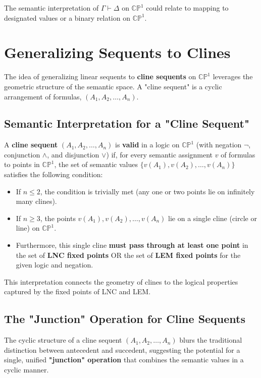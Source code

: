 	The semantic interpretation of $\Gamma \vdash \Delta$ on $\mathbb{CP}^1$ could relate to mapping to designated values or a binary relation on $\mathbb{CP}^1$.
	
	\section{Generalizing Sequents to Clines}
	
	The idea of generalizing linear sequents to \textbf{cline sequents} on $\mathbb{CP}^1$ leverages the geometric structure of the semantic space. A "cline sequent" is a cyclic arrangement of formulas, $(A_1, A_2, \dots, A_n)$.
	
	\subsection{Semantic Interpretation for a "Cline Sequent"}
	
	A \textbf{cline sequent} $(A_1, A_2, \dots, A_n)$ is \textbf{valid} in a logic on $\mathbb{CP}^1$ (with negation $\neg$, conjunction $\wedge$, and disjunction $\vee$) if, for every semantic assignment $v$ of formulas to points in $\mathbb{CP}^1$, the set of semantic values $\{v(A_1), v(A_2), \dots, v(A_n)\}$ satisfies the following condition:
	
	\begin{itemize}
		\item If $n \le 2$, the condition is trivially met (any one or two points lie on infinitely many clines).
		
		\item If $n \ge 3$, the points $v(A_1), v(A_2), \dots, v(A_n)$ lie on a single cline (circle or line) on $\mathbb{CP}^1$.
		
		\item Furthermore, this single cline \textbf{must pass through at least one point} in the set of \textbf{LNC fixed points} OR the set of \textbf{LEM fixed points} for the given logic and negation.
	\end{itemize}
	This interpretation connects the geometry of clines to the logical properties captured by the fixed points of LNC and LEM.
	
	\subsection{The "Junction" Operation for Cline Sequents}
	
	The cyclic structure of a cline sequent $(A_1, A_2, \dots, A_n)$ blurs the traditional distinction between antecedent and succedent, suggesting the potential for a single, unified \textbf{"junction" operation} that combines the semantic values in a cyclic manner.
	
